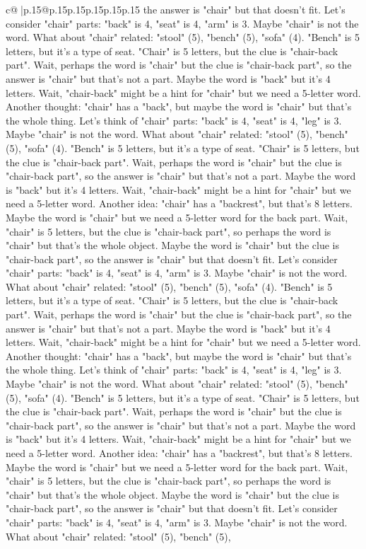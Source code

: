 \documentclass{article}
\begin{document}
{\begin{supertabular}{c@{$\;$}|p{.15\linewidth}@{}p{.15\linewidth}p{.15\linewidth}p{.15\linewidth}p{.15\linewidth}p{.15\linewidth}}
{{{the answer is "chair" but that doesn't fit. Let's consider "chair" parts: "back" is 4, "seat" is 4, "arm" is 3. Maybe "chair" is not the word. What about "chair" related: "stool" (5), "bench" (5), "sofa" (4). "Bench" is 5 letters, but it's a type of seat. "Chair" is 5 letters, but the clue is "chair{-}back part". Wait, perhaps the word is "chair" but the clue is "chair{-}back part", so the answer is "chair" but that's not a part. Maybe the word is "back" but it's 4 letters. Wait, "chair{-}back" might be a hint for "chair" but we need a 5{-}letter word. Another thought: "chair" has a "back", but maybe the word is "chair" but that's the whole thing. Let's think of "chair" parts: "back" is 4, "seat" is 4, "leg" is 3. Maybe "chair" is not the word. What about "chair" related: "stool" (5), "bench" (5), "sofa" (4). "Bench" is 5 letters, but it's a type of seat. "Chair" is 5 letters, but the clue is "chair{-}back part". Wait, perhaps the word is "chair" but the clue is "chair{-}back part", so the answer is "chair" but that's not a part. Maybe the word is "back" but it's 4 letters. Wait, "chair{-}back" might be a hint for "chair" but we need a 5{-}letter word. Another idea: "chair" has a "backrest", but that's 8 letters. Maybe the word is "chair" but we need a 5{-}letter word for the back part. Wait, "chair" is 5 letters, but the clue is "chair{-}back part", so perhaps the word is "chair" but that's the whole object. Maybe the word is "chair" but the clue is "chair{-}back part", so the answer is "chair" but that doesn't fit. Let's consider "chair" parts: "back" is 4, "seat" is 4, "arm" is 3. Maybe "chair" is not the word. What about "chair" related: "stool" (5), "bench" (5), "sofa" (4). "Bench" is 5 letters, but it's a type of seat. "Chair" is 5 letters, but the clue is "chair{-}back part". Wait, perhaps the word is "chair" but the clue is "chair{-}back part", so the answer is "chair" but that's not a part. Maybe the word is "back" but it's 4 letters. Wait, "chair{-}back" might be a hint for "chair" but we need a 5{-}letter word. Another thought: "chair" has a "back", but maybe the word is "chair" but that's the whole thing. Let's think of "chair" parts: "back" is 4, "seat" is 4, "leg" is 3. Maybe "chair" is not the word. What about "chair" related: "stool" (5), "bench" (5), "sofa" (4). "Bench" is 5 letters, but it's a type of seat. "Chair" is 5 letters, but the clue is "chair{-}back part". Wait, perhaps the word is "chair" but the clue is "chair{-}back part", so the answer is "chair" but that's not a part. Maybe the word is "back" but it's 4 letters. Wait, "chair{-}back" might be a hint for "chair" but we need a 5{-}letter word. Another idea: "chair" has a "backrest", but that's 8 letters. Maybe the word is "chair" but we need a 5{-}letter word for the back part. Wait, "chair" is 5 letters, but the clue is "chair{-}back part", so perhaps the word is "chair" but that's the whole object. Maybe the word is "chair" but the clue is "chair{-}back part", so the answer is "chair" but that doesn't fit. Let's consider "chair" parts: "back" is 4, "seat" is 4, "arm" is 3. Maybe "chair" is not the word. What about "chair" related: "stool" (5), "bench" (5), }}}
\end{supertabular}}
\end{document}
